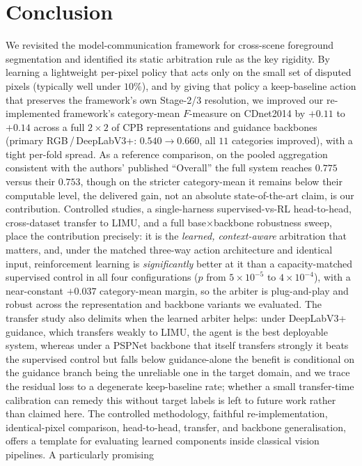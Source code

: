 \documentclass[sn-basic]{sn-jnl}
\newcommand{\Fm}{$F$-measure}
\begin{document}
\section{Conclusion}
\label{sec:conc}
We revisited the model-communication framework for cross-scene foreground
segmentation and identified its static arbitration rule as the key rigidity. By
learning a lightweight per-pixel policy that acts only on the small set of disputed
pixels (typically well under $10\%$), and by giving that policy a keep-baseline action that preserves the
framework's own Stage-2/3 resolution, we improved our re-implemented
framework's category-mean \Fm{} on CDnet2014 by $+0.11$ to $+0.14$ across a full
$2\times2$ of CPB representations and guidance backbones (primary RGB\,/\,DeepLabV3+:
$0.540\!\rightarrow\!0.660$, all $11$ categories improved), with a tight per-fold
spread. As a reference comparison, on the pooled aggregation consistent with the authors'
published ``Overall'' the full system reaches $0.775$ versus their $0.753$, though on the
stricter category-mean it remains below their computable level, the delivered gain,
not an absolute state-of-the-art claim, is our contribution. Controlled studies, a
single-harness supervised-vs-RL head-to-head, cross-dataset transfer to LIMU, and a
full base$\times$backbone robustness sweep, place the contribution precisely: it is
the \emph{learned, context-aware} arbitration that matters, and, under the matched
three-way action architecture and identical input, reinforcement learning is
\emph{significantly} better at it than a capacity-matched supervised control in all four
configurations ($p$ from $5\times10^{-5}$ to $4\times10^{-4}$), with a near-constant
$+0.037$ category-mean margin, so the arbiter is plug-and-play and robust across the
representation and backbone variants we evaluated. The transfer study also delimits when the
learned arbiter helps: under DeepLabV3+ guidance, which transfers weakly to LIMU, the
agent is the best deployable system, whereas under a PSPNet backbone that itself
transfers strongly it beats the supervised control but falls below guidance-alone 
the benefit is conditional on the guidance branch being the unreliable one in the target
domain, and we trace the residual loss to a degenerate keep-baseline rate; whether a
small transfer-time calibration can remedy this without target labels is left to future
work rather than claimed here. The controlled methodology, faithful re-implementation, identical-pixel
comparison, head-to-head, transfer, and backbone generalisation, offers a template for
evaluating learned components inside classical vision pipelines. A particularly promising
\end{document}
